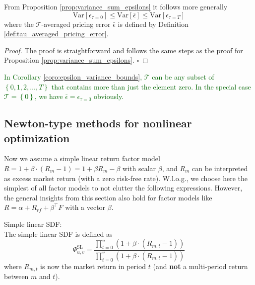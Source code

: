 \begin{corollary}
	\label{coro:epsilon_variance_bounds}
	From Proposition \ref{prop:variance_sum_epsilons} it follows more generally
	\[
	\mathrm{Var} \left[ \epsilon_{\tau=0} \right] \leq
	\mathrm{Var} \left[ \bar{\epsilon} \right] \leq
	\mathrm{Var} \left[ \epsilon_{\tau=T} \right]
	\]
	where the $\mathcal{T}$-averaged pricing error $\bar{\epsilon}$ is defined by Definition \ref{def:tau_averaged_pricing_error}.
\end{corollary}

\begin{proof}
	The proof is straightforward and follows the same steps as the proof for Proposition \ref{prop:variance_sum_epsilons}. $\square$
\end{proof}

\textcolor{darkgreen}{
	In Corollary \ref{coro:epsilon_variance_bounds}, $\mathcal{T}$ can be any subset of $\left\{0,1,2,\dots,T \right\}$ that contains more than just the element zero.
	In the special case $\mathcal{T} = \left\{0\right\}$, we have $\bar{\epsilon} = \epsilon_{\tau=0}$ obviously.
}


\subsection{Newton-type methods for nonlinear optimization}
\label{subsec:newton_methods_nlo}

Now we assume a simple linear return factor model $R = 1 + \beta \cdot \left( R_m - 1\right) = 1 + \beta R_m - \beta$ with scalar $\beta$, and $R_m$ can be interpreted as excess market return (with a zero risk-free rate).
W.l.o.g., we choose here the simplest of all factor models to not clutter the following expressions.
However, the general insights from this section also hold for factor models like $R = \alpha + R_{rf} + \beta^{\top} F$ with a vector $\beta$.

\begin{definition}
	\label{def:simple_linear_sdf}
	Simple linear SDF: \\
	The simple linear SDF is defined as
	\begin{equation}
		\label{eq:simple_linear_sdf}
		\Psi_{u,v}^{\mathrm{SL}} = 
		\frac{\prod_{t=0}^{u} \left( 1 +  \beta \cdot \left( R_{m,t} - 1\right)  \right)}{\prod_{t=0}^{v} \left( 1 + \beta \cdot \left( R_{m,t} - 1\right)  \right)}
	\end{equation}
	where $R_{m,t}$ is now the market return in period $t$ (and \textbf{not} a multi-period return between $m$ and $t$).
\end{definition}

